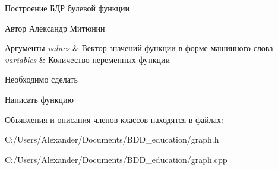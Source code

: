 Построение БДР булевой функции 

\begin{DoxyAuthor}{Автор}
Александр Митюнин 
\end{DoxyAuthor}

\begin{DoxyParams}{Аргументы}
{\em values} & Вектор значений функции в форме машинного слова \\
\hline
{\em variables} & Количество переменных функции\\
\hline
\end{DoxyParams}
\begin{DoxyRefDesc}{Необходимо сделать}
\item[\hyperlink{todo__todo000003}{Необходимо сделать}]Написать функцию \end{DoxyRefDesc}


Объявления и описания членов классов находятся в файлах\+:\begin{DoxyCompactItemize}
\item 
C\+:/\+Users/\+Alexander/\+Documents/\+B\+D\+D\+\_\+education/graph.\+h\item 
C\+:/\+Users/\+Alexander/\+Documents/\+B\+D\+D\+\_\+education/graph.\+cpp\end{DoxyCompactItemize}
